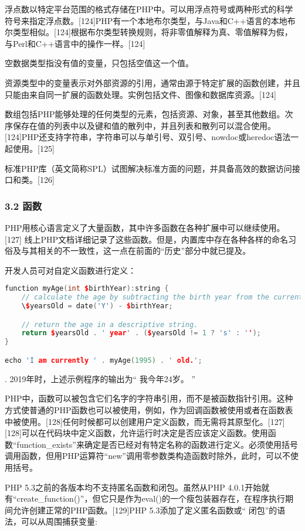 浮点数以特定平台范围的格式存储在PHP中。可以用浮点符号或两种形式的科学符号来指定浮点数。[124]PHP有一个本地布尔类型，与Java和C++语言的本地布尔类型相似。[124]根据布尔类型转换规则，将非零值解释为真、零值解释为假，与Perl和C++语言中的操作一样。[124]

空数据类型指没有值的变量，只包括空值这一个值。

资源类型中的变量表示对外部资源的引用，通常由源于特定扩展的函数创建，并且只能由来自同一扩展的函数处理。实例包括文件、图像和数据库资源。[124]

数组包括PHP能够处理的任何类型的元素，包括资源、对象，甚至其他数组。次序保存在值的列表中以及键和值的散列中，并且列表和散列可以混合使用。[124]PHP还支持字符串，字符串可以与单引号、双引号、nowdoc或heredoc语法一起使用。[125]

标准PHP库（英文简称SPL）试图解决标准方面的问题，并具备高效的数据访问接口和类。[126]
\subsubsection{3.2 函数}
PHP用核心语言定义了大量函数，其中许多函数在各种扩展中可以继续使用。[127] 线上PHP文档详细记录了这些函数。但是，内置库中存在各种各样的命名习俗及与其相关的不一致性，这一点在前面的“历史”部分中就已提及。

开发人员可对自定义函数进行定义：
\begin{lstlisting}[language=cpp]
function myAge(int $birthYear):string {
    // calculate the age by subtracting the birth year from the current year.
    \$yearsOld = date('Y') - $birthYear;

    // return the age in a descriptive string.
    return $yearsOld . ' year' . ($yearsOld != 1 ? 's' : '');
}

echo 'I am currently ' . myAge(1995) . ' old.';
\end{lstlisting}.
2019年时，上述示例程序的输出为“ 我今年24岁。 ”

PHP中，函数可以被包含它们名字的字符串引用，而不是被函数指针引用。这种方式使普通的PHP函数也可以被使用，例如，作为回调函数被使用或者在函数表中被使用。[128]任何时候都可以创建用户定义函数，而无需将其原型化。[127][128]可以在代码块中定义函数，允许运行时决定是否应该定义函数。使用函数“function_exists”来确定是否已经对有特定名称的函数进行定义。必须使用括号调用函数，但用PHP运算符“new”调用零参数类构造函数时除外，此时，可以不使用括号。

PHP 5.3之前的各版本均不支持匿名函数和闭包。虽然从PHP 4.0.1开始就有“create_function()”，但它只是作为eval()的一个瘦包装器存在，在程序执行期间允许创建正常的PHP函数。[129]PHP 5.3添加了定义匿名函数或“ 闭包”的语法，可以从周围捕获变量: